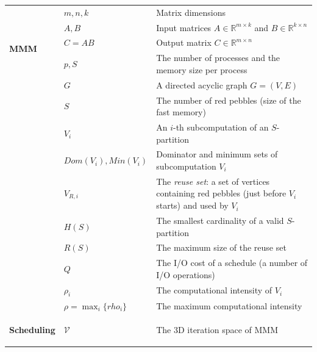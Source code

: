 \documentclass[sigplan,review,anonymous,10pt]{acmart}\settopmatter{printfolios=true,printccs=false,printacmref=false}
\begin{document}
\begin{table}[h]
\vspace{-0.5em}
\setlength{\tabcolsep}{2pt}
\renewcommand{\arraystretch}{0.7}
%
	\centering
	\scriptsize
	\sf
	\begin{tabular}{@{}l|ll@{}}
		\toprule
		\multirow{5}{*}{\begin{turn}{90}\textbf{MMM}\end{turn}}
		& $m, n, k$& Matrix dimensions \\
		& $A, B$& Input matrices $A \in \mathbb{R}^{m \times k}$ and $ B \in \mathbb{R}^{k \times n}$ \\
		& $C = AB$& Output matrix $C \in \mathbb{R}^{m \times n}$ \\
		& $p,S$& The number of processes and the memory size per process \\
		\midrule
		\multirow{13}{*}{\begin{turn}{90}\textbf{I/O complexity}\end{turn}}
		& $G$&A directed acyclic graph $G=(V,E)$\\
		& $S$ & The number of red pebbles (size of the fast memory)\\
		& $V_i$ & An $i$-th subcomputation of an $S$-partition \\
		& $Dom(V_i), Min(V_i)$ & Dominator and minimum sets of subcomputation $V_i$\\
		& $V_{R,i}$ & \makecell[l]{The \emph{reuse set}: a set of vertices 
		containing red pebbles\\(just before $V_i$ starts) and used by $V_i$} \\
		& $H(S)$ & The smallest cardinality of a valid $S$-partition \\
		& $R(S)$ & The maximum size of the reuse set \\
		& $Q$ & The I/O cost of a schedule (a number of I/O operations) \\
		& $\rho_i$ & The computational intensity of $V_i$\\
		& $\rho = \max_i\{rho_i\}$ & The maximum computational intensity\\
		\midrule
		\multirow{10}{*}{\begin{turn}{90}
				\textbf{Scheduling}
			\end{turn}} 
		& $\mathcal{V}$ & The 3D iteration space of MMM 

\end{tabular}
\end{table}
\end{document}
